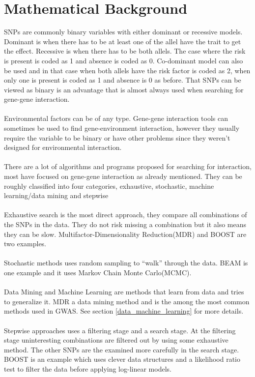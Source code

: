 \documentclass[10pt,a4paper]{report}
\begin{document}
\section{Mathematical Background}
SNPs are commonly binary variables with either dominant or recessive models. Dominant is when there has to be at least one of the allel have the trait to get the effect. Recessive is when there has to be both allels. The case where the risk is present is coded as 1 and absence is coded as 0. Co-dominant model can also be used and in that case when both allels have the risk factor is coded as 2, when only one is present is coded as 1 and absence is 0 as before. That SNPs can be viewed as binary is an advantage that is almost always used when searching for gene-gene interaction.\\
\\
Environmental factors can be of any type\cite{gene_enviroment_2013}. Gene-gene interaction tools can sometimes be used to find gene-environment interaction, however they usually require the variable to be binary or have other problems since they weren't designed for environmental interaction.\cite{gene_enviroment_2013}\\
\\
There are a lot of algorithms and programs proposed for searching for interaction, most have focused on gene-gene interaction as already mentioned. They can be roughly classified into four categories, exhaustive, stochastic, machine learning/data mining and stepwise\cite{fast_high_order_cluster}\\
\\
Exhaustive search is the most direct approach, they compare all combinations of the SNPs in the data. They do not risk missing a combination but it also means they can be slow. Multifactor-Dimensionality Reduction(MDR)\cite{mdr_2001} and BOOST\cite{boost_gene_gene} are two examples.\\
\\
Stochastic methods uses random sampling to ``walk'' through the data. BEAM\cite{beam_2007} is one example and it uses Markov Chain Monte Carlo(MCMC).\\
\\
Data Mining and Machine Learning are methods that learn from data and tries to generalize it. MDR\cite{mdr_2001} a data mining method and is the among the most common methods used in GWAS. See section \ref{data_machine_learning} for more details.\\
\\
Stepwise approaches uses a filtering stage and a search stage. At the filtering stage uninteresting combinations are filtered out by using some exhaustive method. The other SNPs are the examined more carefully in the search stage. BOOST\cite{boost_gene_gene} is an example which uses clever data structures and a likelihood ratio test to filter the data before applying log-linear models.
\end{document}
